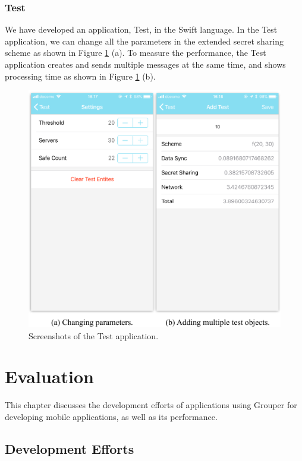 \documentclass[a4paper,11pt]{report}
\begin{document}
\subsection{Test}

We have developed an application, Test, in the Swift language.
In the Test application, we can change all the parameters in the extended secret sharing scheme as shown in Figure \ref{fig:test} (a).
To measure the performance, the Test application creates and sends multiple messages at the same time, and shows processing time as shown in Figure \ref{fig:test} (b).

\begin{figure}[t]
	\centering
	\includegraphics[scale=0.7]{test}
	\caption{Screenshots of the Test application.}
	\label{fig:test}
\end{figure}

\chapter{Evaluation} \label{chapter:evaluation}

This chapter discusses the development efforts of applications using Grouper for developing mobile applications, as well as its performance.

\section{Development Efforts} \label{section:development_efforts}
\end{document}
